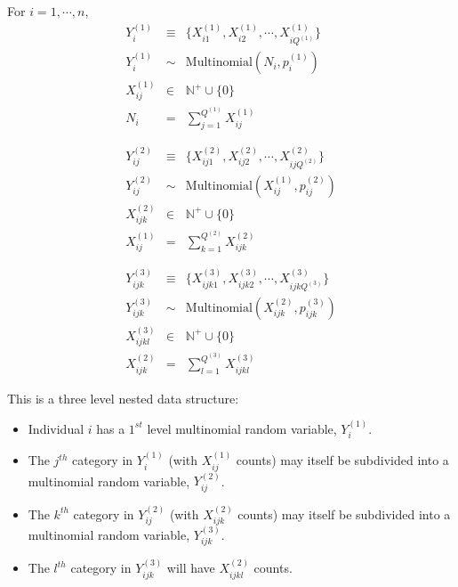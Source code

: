 \documentclass[11pt]{article}
\begin{document}
For $i = 1, \cdots, n$, 
\begin{eqnarray*}
Y^{(1)}_i &\equiv&  \{X^{(1)}_{i1}, X^{(1)}_{i2}, \cdots, X^{(1)}_{iQ^{(1)}}\}\\
Y^{(1)}_i &\sim& \text{Multinomial}(N_i, p^{(1)}_i)\\
 X^{(1)}_{ij} &\in&  \mathbb{N}^+ \cup \{0\}\\
 N_i  &=& \sum_{j=1}^{Q^{(1)}} X^{(1)}_{ij} \\
 \\
 \\
Y^{(2)}_{ij} &\equiv&  \{X^{(2)}_{ij1}, X^{(2)}_{ij2}, \cdots, X^{(2)}_{ijQ^{(2)}}\}\\
Y^{(2)}_{ij} &\sim& \text{Multinomial}(X^{(1)}_{ij}, p^{(2)}_{ij})\\
 X^{(2)}_{ijk} &\in& \mathbb{N}^+ \cup \{0\}\\
 X^{(1)}_{ij}  &=& \sum_{k=1}^{Q^{(2)}} X^{(2)}_{ijk} \\
 \\
 \\
Y^{(3)}_{ijk} &\equiv&  \{X^{(3)}_{ijk1}, X^{(3)}_{ijk2}, \cdots, X^{(3)}_{ijkQ^{(3)}}\}\\
Y^{(3)}_{ijk} &\sim& \text{Multinomial}(X^{(2)}_{ijk}, p^{(3)}_{ijk})\\
 X^{(3)}_{ijkl} &\in& \mathbb{N}^+ \cup \{0\}\\
 X^{(2)}_{ijk}  &=& \sum_{l=1}^{Q^{(3)}} X^{(3)}_{ijkl} 
\end{eqnarray*}

This is a three level nested data structure:
\begin{itemize}
\item  Individual $i$ has a $1^{st}$ level multinomial random variable, $Y^{(1)}_i$.

\item The $j^{th}$ category in $Y^{(1)}_i$ (with $X^{(1)}_{ij}$ counts) 
may itself be subdivided into a multinomial random variable, $Y^{(2)}_{ij}$. 

\item The $k^{th}$ category in $Y^{(2)}_{ij}$ (with $X^{(2)}_{ijk}$ counts) 
may itself be subdivided into a multinomial random variable, $Y^{(3)}_{ijk}$. 

\item The $l^{th}$ category in $Y^{(3)}_{ijk}$ will have $X^{(2)}_{ijkl}$ counts. 
\end{itemize}
\end{document}
